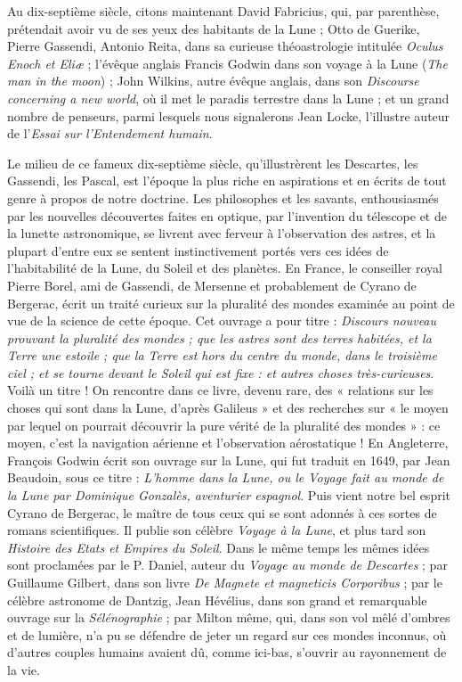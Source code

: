 \documentclass[a4paper, 11pt, oneside, landscape]{article}
\begin{document}
Au dix-septième siècle, citons maintenant David Fabricius, qui, par parenthèse, prétendait avoir vu de ses yeux des habitants de la Lune ; Otto de Guerike, Pierre Gassendi, Antonio Reita, dans sa curieuse théoastrologie intitulée \emph{Oculus Enoch et Eliæ} ; l'évêque anglais Francis Godwin dans son voyage à la Lune (\emph{The man in the moon}) ; John Wilkins, autre évêque anglais, dans son \emph{Discourse concerning a new world}, où il met le paradis terrestre dans la Lune ; et un grand nombre de penseurs, parmi lesquels nous signalerons Jean Locke, l'illustre auteur de l'\emph{Essai sur l'Entendement humain}.

Le milieu de ce fameux dix-septième siècle, qu'illustrèrent les Descartes, les Gassendi, les Pascal, est l'époque la plus riche en aspirations et en écrits de tout genre à propos de notre doctrine. Les philosophes et les savants, enthousiasmés par les nouvelles découvertes faites en optique, par l'invention du télescope et de la lunette astronomique, se livrent avec ferveur à l'observation des astres, et la plupart d'entre eux se sentent instinctivement portés vers ces idées de l'habitabilité de la Lune, du Soleil et des planètes. En France, le conseiller royal Pierre Borel, ami de Gassendi, de Mersenne et probablement de Cyrano de Bergerac, écrit un traité curieux sur la pluralité des mondes examinée au point de vue de la science de cette époque. Cet ouvrage a pour titre : \emph{Discours nouveau prouvant la pluralité des mondes ; que les astres sont des terres habitées, et la Terre une estoile ; que la Terre est hors du centre du monde, dans le troisième ciel ; et se tourne devant le Soleil qui est fixe : et autres choses très-curieuses}. Voilà un titre ! On rencontre dans ce livre, devenu rare, des « relations sur les choses qui sont dans la Lune, d'après Galileus » et des recherches sur « le moyen par lequel on pourrait découvrir la pure vérité de la pluralité des mondes » : ce moyen, c'est la navigation aérienne et l'observation aérostatique ! En Angleterre, François Godwin écrit son ouvrage sur la Lune, qui fut traduit en 1649, par Jean Beaudoin, sous ce titre : \emph{L'homme dans la Lune, ou le Voyage fait au monde de la Lune par Dominique Gonzalès, aventurier espagnol}. Puis vient notre bel esprit Cyrano de Bergerac, le maître de tous ceux qui se sont adonnés à ces sortes de romans scientifiques. Il publie son célèbre \emph{Voyage à la Lune}, et plus tard son \emph{Histoire des Etats et Empires du Soleil}. Dans le même temps les mêmes idées sont proclamées par le P. Daniel, auteur du \emph{Voyage au monde de Descartes} ; par Guillaume Gilbert, dans son livre \emph{De Magnete et magneticis Corporibus} ; par le célèbre astronome de Dantzig, Jean Hévélius, dans son grand et remarquable ouvrage sur la \emph{Sélénographie} ; par Milton même, qui, dans son vol mêlé d'ombres et de lumière, n'a pu se défendre de jeter un regard sur ces mondes inconnus, où d'autres couples humains avaient dû, comme ici-bas, s'ouvrir au rayonnement de la vie.
\end{document}
